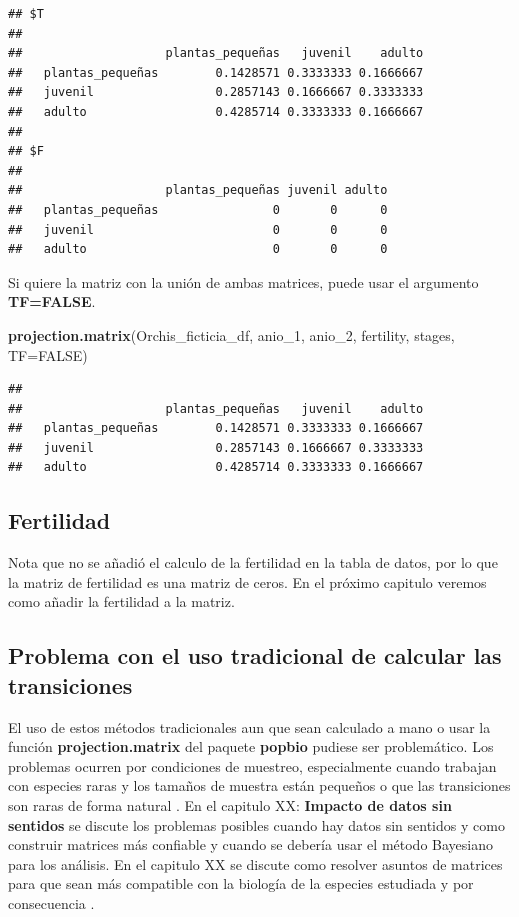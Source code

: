 \documentclass[
]{book}
\newenvironment{Shaded}{\begin{snugshade}}{\end{snugshade}}
\newcommand{\AttributeTok}[1]{\textcolor[rgb]{0.13,0.29,0.53}{#1}}
\newcommand{\ConstantTok}[1]{\textcolor[rgb]{0.56,0.35,0.01}{#1}}
\newcommand{\FunctionTok}[1]{\textcolor[rgb]{0.13,0.29,0.53}{\textbf{#1}}}
\newcommand{\NormalTok}[1]{#1}
\theoremstyle{definition}
\theoremstyle{definition}
\theoremstyle{definition}
\theoremstyle{definition}
\theoremstyle{remark}
\begin{document}
\begin{verbatim}
## $T
##                   
##                    plantas_pequeñas   juvenil    adulto
##   plantas_pequeñas        0.1428571 0.3333333 0.1666667
##   juvenil                 0.2857143 0.1666667 0.3333333
##   adulto                  0.4285714 0.3333333 0.1666667
## 
## $F
##                   
##                    plantas_pequeñas juvenil adulto
##   plantas_pequeñas                0       0      0
##   juvenil                         0       0      0
##   adulto                          0       0      0
\end{verbatim}

Si quiere la matriz con la unión de ambas matrices, puede usar el argumento \textbf{TF=FALSE}.

\begin{Shaded}
\begin{Highlighting}[]
\FunctionTok{projection.matrix}\NormalTok{(Orchis\_ficticia\_df, anio\_1, anio\_2, fertility, stages, }\AttributeTok{TF=}\ConstantTok{FALSE}\NormalTok{)}
\end{Highlighting}
\end{Shaded}

\begin{verbatim}
##                   
##                    plantas_pequeñas   juvenil    adulto
##   plantas_pequeñas        0.1428571 0.3333333 0.1666667
##   juvenil                 0.2857143 0.1666667 0.3333333
##   adulto                  0.4285714 0.3333333 0.1666667
\end{verbatim}

\subsection{Fertilidad}\label{fertilidad}

Nota que no se añadió el calculo de la fertilidad en la tabla de datos, por lo que la matriz de fertilidad es una matriz de ceros. En el próximo capitulo veremos como añadir la fertilidad a la matriz.

\subsection{Problema con el uso tradicional de calcular las transiciones}\label{problema-con-el-uso-tradicional-de-calcular-las-transiciones}

El uso de estos métodos tradicionales aun que sean calculado a mano o usar la función \textbf{projection.matrix} del paquete \textbf{popbio} pudiese ser problemático. Los problemas ocurren por condiciones de muestreo, especialmente cuando trabajan con especies raras y los tamaños de muestra están pequeños o que las transiciones son raras de forma natural \citep{tremblay2021population, gascoigne2023standard}. En el capitulo XX: \textbf{Impacto de datos sin sentidos} se discute los problemas posibles cuando hay datos sin sentidos y como construir matrices más confiable y cuando se debería usar el método Bayesiano para los análisis. En el capitulo XX se discute como resolver asuntos de matrices para que sean más compatible con la biología de la especies estudiada y por consecuencia .
\end{document}
